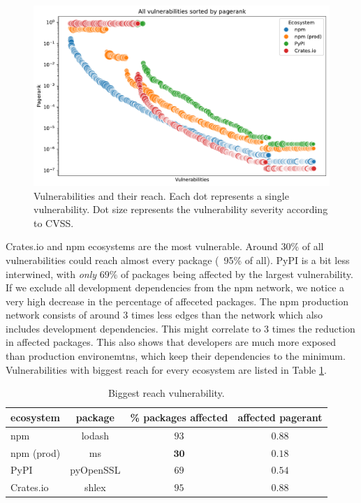 \documentclass[9pt,twocolumn,twoside]{pnas-report}
\begin{document}
\begin{figure}[t]\centering%
	\includegraphics[width=\linewidth]{vuln_pagerank}
	\caption{Vulnerabilities and their reach. Each dot represents a single vulnerability. Dot size represents the vulnerability severity according to CVSS.  }
	\label{fig:reach}
\end{figure}

Crates.io and npm ecosystems are the most vulnerable.
Around 30\% of all vulnerabilities could reach almost every package (~95\% of all).
PyPI is a bit less interwined, with \textit{only} 69\% of packages being affected by the largest vulnerability.
If we exclude all development dependencies from the npm network, we notice a very high decrease in the percentage of affeceted packages.
The npm production network consists of around 3 times less edges than the network which also includes development dependencies.
This might correlate to 3 times the reduction in affected packages.
This also shows that developers are much more exposed than production environemtns, which keep their dependencies to the minimum.
Vulnerabilities with biggest reach for every ecosystem are listed in Table \ref{tab:highest_reach}.

\begin{table}[h]\centering%
	\caption{Biggest reach vulnerability.}
	\begin{tabular}{l|ccc}
		ecosystem  & package   & \% packages affected & affected pagerant \\\hline
		npm        & lodash    & $93$                 & $0.88$            \\
		npm (prod) & ms        & $\mathbf{30}$        & $\mathbf{0.18}$   \\
		PyPI       & pyOpenSSL & $69$                 & $0.54$            \\
		Crates.io  & shlex     & $95$                 & $0.88$            \\
	\end{tabular}
	\label{tab:highest_reach}
\end{table}
\end{document}
